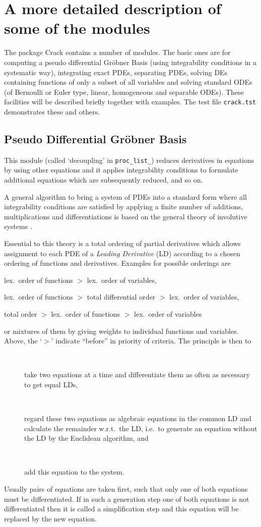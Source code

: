 \documentclass[12pt]{article}
\begin{document}
\section{A more detailed description of some of the modules}
The package {\sc Crack} contains a number of modules.
The basic ones are for computing a pseudo differential Gr\"{o}bner
Basis (using integrability conditions in a systematic way), integrating
exact PDEs, separating PDEs, solving DEs containing functions of only
a subset of all variables and solving standard ODEs (of Bernoulli or
Euler type, linear, homogeneous and separable ODEs). These facilities
will be described briefly together with examples. The test file
{\tt crack.tst} demonstrates these and others.

\subsection{Pseudo Differential Gr\"{o}bner Basis}
This module (called `decoupling' in {\tt proc\_list\_})
reduces derivatives in equations by using other equations and it applies
integrability conditions to formulate additional equations which are
subsequently reduced, and so on.

A general algorithm to bring a system of PDEs into a standard form
where all integrability conditions are satisfied by applying
a finite number of additions, multiplications and differentiations
is based on the general theory of involutive systems \cite{Riq,Th,Ja}.

Essential to this theory is a total ordering of partial derivatives
which allows assignment to each PDE of a {\em Leading Derivative}
(LD) according to a chosen ordering of functions
and derivatives. Examples for possible orderings are
\begin{description}
\item lex.\ order of functions $>$ lex.\ order of variables,
\item lex.\ order of functions $>$ total differential order $>$ lex.\
      order of variables,
\item total order $>$ lex.\ order of functions $>$ lex.\ order of variables
\end{description}
or mixtures of them by giving weights to individual functions and variables.
Above, the `$>$' indicate ``before'' in priority of criteria. The principle
is then to
\begin{description}
\item[\ \ ] take two equations at a time and differentiate them as often as
necessary to get equal LDs,
\item[\ \ ]  regard these two equations as algebraic equations in
the common LD and calculate the remainder w.r.t.\ the LD, i.e.\ to
generate an equation without the LD by the Euclidean algorithm, and
\item[\ \ ]  add this equation to the system.
\end{description}
Usually pairs of equations are taken first, such that only one
of both equations must be
differentiated. If in such a generation step one of both equations is not
differentiated then it is called a
simplification step and this equation will be replaced by the new equation.
\end{document}
